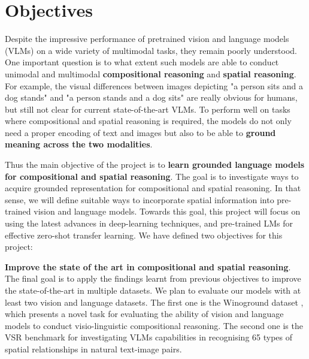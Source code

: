 \section{Objectives} \label{sec:objectives}

Despite the impressive performance of pretrained vision and language models (VLMs) on a wide variety of multimodal tasks, they remain poorly understood. One important question is to what extent such models are able to conduct unimodal and multimodal \textbf{compositional reasoning} and \textbf{spatial reasoning}. For example, the visual differences between images depicting "a person sits and a dog stands" and "a person stands and a dog sits" are really obvious for humans, but still not clear for current state-of-the-art VLMs. To perform well on tasks where compositional and spatial reasoning is required, the models do not only need a proper encoding of text and images but also to be able to \textbf{ground meaning across the two modalities}.

Thus the main objective of the project is to \textbf{learn grounded language models for compositional and spatial reasoning}. The goal is to investigate ways to acquire grounded representation for compositional and spatial reasoning. In that sense, we will define suitable ways to incorporate spatial information into pre-trained vision and language models. Towards this goal, this project will focus on using the latest advances in deep-learning techniques, and pre-trained LMs for effective zero-shot transfer learning. We have defined two objectives for this project:

\textbf{Improve the state of the art in compositional and spatial reasoning}. The final goal is to apply the findings learnt from previous objectives to improve the state-of-the-art in multiple datasets. We plan to evaluate our models with at least two vision and language datasets. The first one is the Winoground dataset \cite{thrush2022winoground}, which presents a novel task for evaluating the ability of vision and language models to conduct visio-linguistic compositional reasoning. The second one is the VSR benchmark \cite{liu2022visual} for investigating VLMs capabilities in recognising 65 types of spatial relationships in natural text-image pairs.


